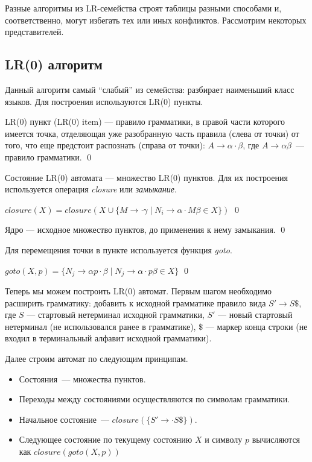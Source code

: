 Разные алгоритмы из LR-семейства строят таблицы разными способами и, соответственно, могут избегать тех или иных конфликтов. Рассмотрим некоторых представителей.

\subsection{LR(0) алгоритм}

Данный алгоритм самый ``слабый'' из семейства: разбирает наименьший класс языков.
Для построения используются LR(0) пункты.

\begin{definition}
LR(0) пункт (LR(0) item) --- правило грамматики, в правой части которого имеется точка, отделяющая уже разобранную часть правила (слева от точки) от того, что еще предстоит распознать (справа от точки): $A \to \alpha \cdot \beta$, где $A \to \alpha \beta$~--- правило грамматики.
\qed
\end{definition}

Состояние LR(0) автомата --- множество LR(0) пунктов. Для их построения используется операция \textit{closure} или \textit{замыкание}.

\begin{definition}
$closure(X)  = closure(X \cup \{M \rightarrow \cdot \gamma \mid N_i \rightarrow \alpha\cdot M\beta \in X \})$
\qed
\end{definition}

\begin{definition}
Ядро --- исходное множество пунктов, до применения к нему замыкания.
\qed
\end{definition}

Для перемещения точки в пункте используется функция \textit{goto}.

\begin{definition}
$goto(X,p)  = \{N_j \rightarrow \alpha p \cdot \beta \mid N_j \rightarrow \alpha\cdot p\beta \in X \}$
\qed
\end{definition}

Теперь мы можем построить LR(0) автомат.
Первым шагом необходимо расширить грамматику: добавить к исходной грамматике правило вида $S' \to S \$$, где $S$ --- стартовый нетерминал исходной грамматики, $S'$ --- новый стартовый нетерминал (не использовался ранее в грамматике), $\$$ --- маркер конца строки (не входил в терминальный алфавит исходной грамматики).

Далее строим автомат по следующим принципам.

\begin{itemize}
    \item Состояния~--- множества пунктов.
    \item Переходы между состояниями осуществляются по символам грамматики.
    \item Начальное состояние~--- $closure(\{S'\to
    \cdot S \$\})$.
    \item Следующее состояние по текущему состоянию $X$ и символу $p$ вычисляются как $closure(goto(X, p))$
  \end{itemize}

